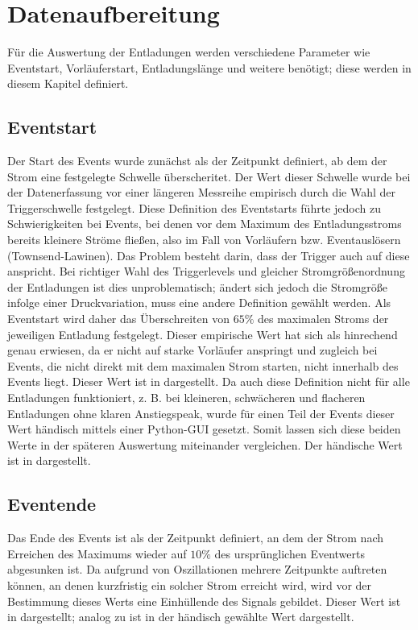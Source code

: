 \chapter{Datenaufbereitung}
\label{chap:features}

Für die Auswertung der Entladungen werden verschiedene Parameter wie Eventstart, Vorläuferstart, Entladungslänge und weitere benötigt; diese werden in diesem Kapitel definiert.

\section{Eventstart}
\label{sec:eventstart}

Der Start des Events wurde zunächst als der Zeitpunkt definiert, ab dem der Strom eine festgelegte Schwelle überscheritet. Der Wert dieser Schwelle wurde bei der Datenerfassung vor einer längeren Messreihe empirisch durch die Wahl der Triggerschwelle festgelegt. Diese Definition des Eventstarts führte jedoch zu Schwierigkeiten bei Events, bei denen vor dem Maximum des Entladungsstroms bereits kleinere Ströme fließen, also im Fall von Vorläufern bzw. Eventauslösern (Townsend-Lawinen). Das Problem besteht darin, dass der Trigger auch auf diese anspricht. Bei richtiger Wahl des Triggerlevels und gleicher Stromgrößenordnung der Entladungen ist dies unproblematisch; ändert sich jedoch die Stromgröße infolge einer Druckvariation, muss eine andere Definition gewählt werden. Als Eventstart wird daher das Überschreiten von \(65 \%\) des maximalen Stroms der jeweiligen Entladung festgelegt. Dieser empirische Wert hat sich als hinrechend genau erwiesen, da er nicht auf starke Vorläufer anspringt und zugleich bei Events, die nicht direkt mit dem maximalen Strom starten, nicht innerhalb des Events liegt. Dieser Wert ist in  dargestellt. Da auch diese Definition nicht für alle Entladungen funktioniert, z. B. bei kleineren, schwächeren und flacheren Entladungen ohne klaren Anstiegspeak, wurde für einen Teil der Events dieser Wert händisch mittels einer Python-GUI gesetzt. Somit lassen sich diese beiden Werte in der späteren Auswertung miteinander vergleichen. Der händische Wert ist in  dargestellt.

\section{Eventende}
\label{sec:eventende}
Das Ende des Events ist als der Zeitpunkt definiert, an dem der Strom nach Erreichen des Maximums wieder auf \(10\%\) des ursprünglichen Eventwerts abgesunken ist. Da aufgrund von Oszillationen mehrere Zeitpunkte auftreten können, an denen kurzfristig ein solcher Strom erreicht wird, wird vor der Bestimmung dieses Werts eine Einhüllende des Signals gebildet. Dieser Wert ist in  dargestellt; analog zu  ist in  der händisch gewählte Wert dargestellt.

